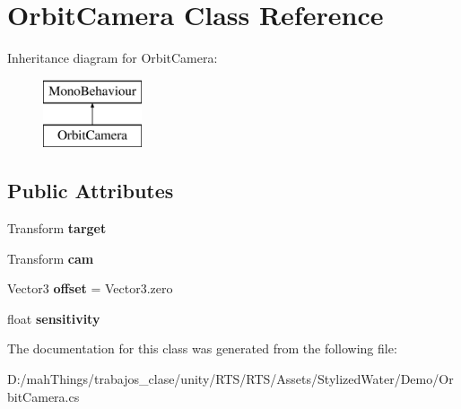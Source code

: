 \hypertarget{class_orbit_camera}{}\section{Orbit\+Camera Class Reference}
\label{class_orbit_camera}
Inheritance diagram for Orbit\+Camera\+:\begin{figure}[H]
\begin{center}
\leavevmode
\includegraphics[height=2.000000cm]{class_orbit_camera}
\end{center}
\end{figure}
\subsection*{Public Attributes}
\begin{DoxyCompactItemize}
\item 
\mbox{\label{class_orbit_camera_af65ae929a8138327191e074922911bd9}} 
Transform {\bfseries target}
\item 
\mbox{\label{class_orbit_camera_a5e5eac1b52d3a260f0ecf0359576ed01}} 
Transform {\bfseries cam}
\item 
\mbox{\label{class_orbit_camera_a2038e2fa3d94450d6c49dc2539cb4ef4}} 
Vector3 {\bfseries offset} = Vector3.\+zero
\item 
\mbox{\label{class_orbit_camera_ae8a7b6dad04c90d6d916daef5bcfd5e2}} 
float {\bfseries sensitivity}
\end{DoxyCompactItemize}


The documentation for this class was generated from the following file\+:\begin{DoxyCompactItemize}
\item 
D\+:/mah\+Things/trabajos\+\_\+clase/unity/\+R\+T\+S/\+R\+T\+S/\+Assets/\+Stylized\+Water/\+Demo/Orbit\+Camera.\+cs\end{DoxyCompactItemize}
